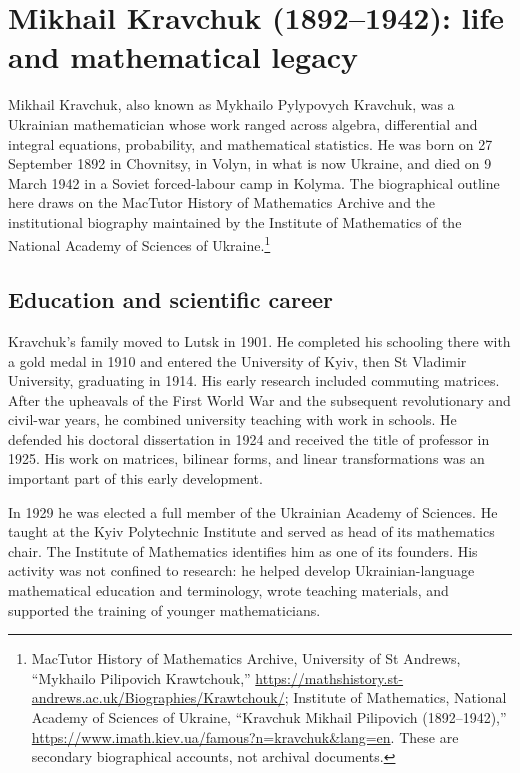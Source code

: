 \section{Mikhail Kravchuk (1892--1942): life and mathematical legacy}
\label{sec:kravchuk-biography}



Mikhail Kravchuk, also known as Mykhailo Pylypovych Kravchuk, was a
Ukrainian mathematician whose work ranged across algebra, differential
and integral equations, probability, and mathematical statistics. He was
born on 27 September 1892 in Chovnitsy, in Volyn, in what is now Ukraine,
and died on 9 March 1942 in a Soviet forced-labour camp in Kolyma.
The biographical outline here draws on the MacTutor History of Mathematics
Archive and the institutional biography maintained by the Institute of
Mathematics of the National Academy of Sciences of Ukraine.\footnote{MacTutor
History of Mathematics Archive, University of St Andrews,
``Mykhailo Pilipovich Krawtchouk,''
\url{https://mathshistory.st-andrews.ac.uk/Biographies/Krawtchouk/};
Institute of Mathematics, National Academy of Sciences of Ukraine,
``Kravchuk Mikhail Pilipovich (1892--1942),''
\url{https://www.imath.kiev.ua/famous?n=kravchuk&lang=en}.
These are secondary biographical accounts, not archival documents.}

\subsection*{Education and scientific career}
Kravchuk's family moved to Lutsk in 1901. He completed his schooling there
with a gold medal in 1910 and entered the University of Kyiv, then
St Vladimir University, graduating in 1914. His early research included
commuting matrices. After the upheavals of the First World War and the
subsequent revolutionary and civil-war years, he combined university
teaching with work in schools. He defended his doctoral dissertation in
1924 and received the title of professor in 1925. His work on matrices,
bilinear forms, and linear transformations was an important part of this
early development.

In 1929 he was elected a full member of the Ukrainian Academy of Sciences.
He taught at the Kyiv Polytechnic Institute and served as head of its
mathematics chair. The Institute of Mathematics identifies him as one of
its founders. His activity was not confined to research: he helped develop
Ukrainian-language mathematical education and terminology, wrote teaching
materials, and supported the training of younger mathematicians.

